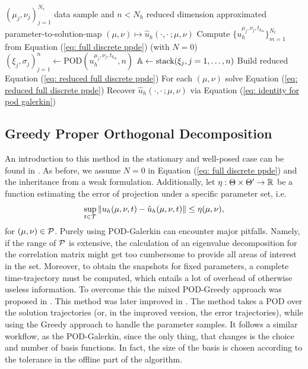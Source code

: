\begin{algorithm}
    \caption{POD-Galerkin} \label{algo: pod-galerkin}
    \begin{algorithmic}[1]
        \Require $\left(\mu_j, \nu_j\right)_{j=1}^{N_s}$ data sample
        and $n < N_h$ reduced dimension
        \Ensure approximated parameter-to-solution-map $(\mu, \nu) \mapsto 
        \hat{u}_h(\cdot, \cdot \, ; \mu, \nu)$
        \State Compute $\{u_h^{\mu_j, \nu_j, t_{k_m}}\}_{m=1}^{N_t}$ from 
        Equation (\ref{eq: full discrete ppde}) (with $N = 0$)
        \State $(\xi_j, \sigma_j)_{j=1}^n \gets \text{POD}(u_h^{\mu_j,\nu_j,t_{k_m}}, n)$
        \State $\mathbb{A} \gets \text{stack}(\xi_j, j=1, \dots, n)$
        \State Build reduced Equation (\ref{eq: reduced full discrete ppde}) 
        \State For each $(\mu, \nu)$ solve Equation (\ref{eq: reduced full discrete ppde})
        \State Recover $\hat{u}_h(\cdot, \cdot \, ; \mu, \nu)$ via Equation (\ref{eq: identity for pod galerkin})
    \end{algorithmic}
\end{algorithm}





\subsection{Greedy Proper Orthogonal Decomposition}





An introduction to this method in the stationary and well-posed case can be found in \cite{siena2022pod}. As before, 
we assume $N = 0$ in Equation (\ref{eq: full discrete ppde}) and the inheritance
from a weak formulation. Additionally, let $\eta : \Theta \times \Theta' \to \mathbb{R}$ be 
a function estimating the error of projection under a specific parameter set, i.e. 
\begin{equation*}
    \sup\limits_{t \in \mathcal{T}} \, \lVert u_h(\mu, \nu, t) - \hat{u}_h(\mu, \nu, t) \rVert \leq \eta(\mu, \nu),
\end{equation*}
for $(\mu, \nu) \in \mathcal{P}$. Purely using POD-Galerkin can encounter major pitfalls. Namely, if the range of $\mathcal{P}$ is extensive, 
the calculation of an eigenvalue decomposition for the correlation matrix might get too cumbersome to provide all
areas of interest in the set. Moreover, to obtain the snapshots for fixed parameters, a complete time-trajectory must
be computed, which entails a lot of overhead of otherwise useless information. To overcome this the mixed POD-Greedy approach 
was proposed in \cite{grepl2005rb}. This method was later improved in \cite{haasdonk2008pod}. The method 
takes a POD over the solution trajectories
(or, in the improved version, the error trajectories), while using the Greedy approach to handle the parameter samples.
It follows a similar workflow, as the POD-Galerkin, since the only thing, that changes is the choice and number of basis functions.
In fact, the size of the basis is chosen according to the tolerance in the offline part of the algorithm.

